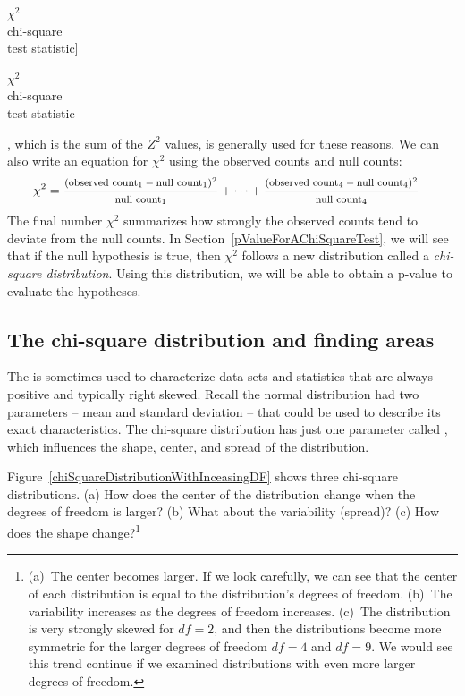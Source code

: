$\chi^2$\vspace{0.5mm}\\\footnotesize chi-square\\test statistic]{\raggedright\vspace{9mm}

$\chi^2$\vspace{0.5mm}\\\footnotesize chi-square\\test statistic}, which is the sum of the $Z^2$ values, is generally used for these reasons. We can also write an equation for $\chi^2$ using the observed counts and null counts:
{\begin{align*}
\chi^2 &=
	\frac
	{\text{\footnotesize$(\text{observed count}_1 - \text{null count}_1)^2$}}
	{\text{\footnotesize$\text{null count}_1$}}
	+ \dots + \frac
	{\text{\footnotesize$(\text{observed count}_4 - \text{null count}_4)^2$}}
	{\text{\footnotesize$\text{null count}_4$}}
\end{align*}
}The final number $\chi^2$ summarizes how strongly the observed counts tend to deviate from the null counts. In Section~\ref{pValueForAChiSquareTest}, we will see that if the null hypothesis is true, then $\chi^2$ follows a new distribution called a \emph{chi-square distribution}. Using this distribution, we will be able to obtain a p-value to evaluate the hypotheses.


\subsection{The chi-square distribution and finding areas}

The  is sometimes used to characterize data sets and statistics that are always positive and typically right skewed. Recall the normal distribution had two parameters -- mean and standard deviation -- that could be used to describe its exact characteristics. The chi-square distribution has just one parameter called , which influences the shape, center, and spread of the distribution.

\begin{exercise}\label{exerChiSquareDistributionDescriptionWithMoreDOF}
Figure~\ref{chiSquareDistributionWithInceasingDF} shows three chi-square distributions. (a) How does the center of the distribution change when the degrees of freedom is larger? (b) What about the variability (spread)? (c) How does the shape change?\footnote{(a)~The center becomes larger. If we look carefully, we can see that the center of each distribution is equal to the distribution's degrees of freedom. (b)~The variability increases as the degrees of freedom increases. (c)~The distribution is very strongly skewed for $df=2$, and then the distributions become more symmetric for the larger degrees of freedom $df=4$ and $df=9$. We would see this trend continue if we examined distributions with even more larger degrees of freedom.}
\end{exercise}

